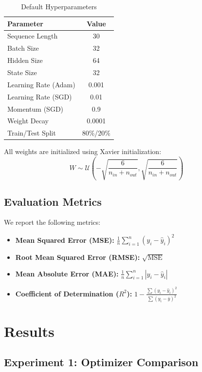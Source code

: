 \documentclass[11pt,a4paper]{article}
\begin{document}
\begin{table}[H]
\centering
\caption{Default Hyperparameters}
\begin{tabular}{lc}
\toprule
\textbf{Parameter} & \textbf{Value} \\
\midrule
Sequence Length & 30 \\
Batch Size & 32 \\
Hidden Size & 64 \\
State Size & 32 \\
Learning Rate (Adam) & 0.001 \\
Learning Rate (SGD) & 0.01 \\
Momentum (SGD) & 0.9 \\
Weight Decay & 0.0001 \\
Train/Test Split & 80\%/20\% \\
\bottomrule
\end{tabular}
\end{table}

All weights are initialized using Xavier initialization:
\begin{equation}
    W \sim \mathcal{U}\left(-\sqrt{\frac{6}{n_{in} + n_{out}}}, \sqrt{\frac{6}{n_{in} + n_{out}}}\right)
\end{equation}

\subsection{Evaluation Metrics}

We report the following metrics:

\begin{itemize}
    \item \textbf{Mean Squared Error (MSE):} $\frac{1}{n}\sum_{i=1}^{n}(y_i - \hat{y}_i)^2$
    \item \textbf{Root Mean Squared Error (RMSE):} $\sqrt{\text{MSE}}$
    \item \textbf{Mean Absolute Error (MAE):} $\frac{1}{n}\sum_{i=1}^{n}|y_i - \hat{y}_i|$
    \item \textbf{Coefficient of Determination ($R^2$):} $1 - \frac{\sum(y_i - \hat{y}_i)^2}{\sum(y_i - \bar{y})^2}$
\end{itemize}

\section{Results}

\subsection{Experiment 1: Optimizer Comparison}
\end{document}

